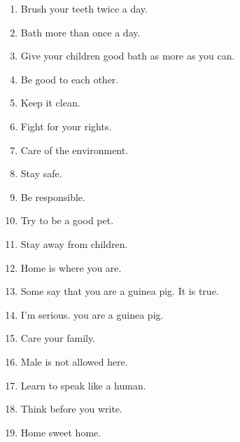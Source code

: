 \documentclass{article}
\begin{document}
\begin{multicols}{2}
\begin{enumerate}
\item Brush your teeth twice a day.
\item Bath more than once a day.
\item Give your children good bath as more as you can.  
\item Be good to each other.
\item Keep it clean.
\item Fight for your rights.
\item Care of the environment.
\item Stay safe.
\item Be responsible.
\item Try to be a good pet.
\item Stay away from children.
\item Home is where you are.
\item Some say that you are a guinea pig. It is true.
\item I'm serious. you are a guinea pig.
\item Care your family.
\item Male is not allowed here. 
\item Learn to speak like a human.
\item Think before you write. 
\item Home sweet home.
\end{enumerate}
\end{multicols}
\end{document}
